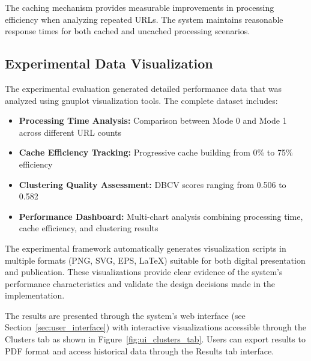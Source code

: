 The caching mechanism provides measurable improvements in processing efficiency when analyzing repeated URLs. The system maintains reasonable response times for both cached and uncached processing scenarios.

\subsection{Experimental Data Visualization}

The experimental evaluation generated detailed performance data that was analyzed using gnuplot visualization tools. The complete dataset includes:

\begin{itemize}
\item \textbf{Processing Time Analysis:} Comparison between Mode 0 and Mode 1 across different URL counts
\item \textbf{Cache Efficiency Tracking:} Progressive cache building from 0\% to 75\% efficiency
\item \textbf{Clustering Quality Assessment:} DBCV scores ranging from 0.506 to 0.582
\item \textbf{Performance Dashboard:} Multi-chart analysis combining processing time, cache efficiency, and clustering results
\end{itemize}

The experimental framework automatically generates visualization scripts in multiple formats (PNG, SVG, EPS, LaTeX) suitable for both digital presentation and publication. These visualizations provide clear evidence of the system's performance characteristics and validate the design decisions made in the implementation.

The results are presented through the system's web interface (see Section~\ref{sec:user_interface}) with interactive visualizations accessible through the Clusters tab as shown in Figure~\ref{fig:ui_clusters_tab}. Users can export results to PDF format and access historical data through the Results tab interface.

 